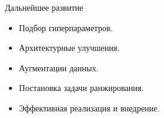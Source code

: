 \documentclass[14pt,aspectratio=169,hyperref={pdftex,unicode},xcolor=dvipsnames]{beamer}
\begin{document}
\begin{frame}{Дальнейшее развитие}

\begin{itemize}
  \item Подбор гиперпараметров.
  \item Архитектурные улучшения.
  \item Аугментации данных.
  \item Постановка задачи ранжирования.
  \item Эффективная реализация и внедрение.
\end{itemize}

\end{frame}



\end{document}
